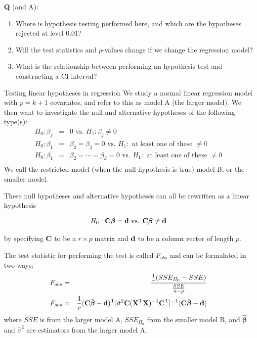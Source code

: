 \documentclass[
  ignorenonframetext,
]{beamer}
\begin{document}
\begin{frame}
\textbf{Q} (and A):

\begin{enumerate}
\item
  Where is hypothesis testing performed here, and which are the
  hypotheses rejected at level \(0.01\)?
\item
  Will the test statistics and \(p\)-values change if we change the
  regression model?
\item
  What is the relationship between performing an hypothesis test and
  constructing a CI interval?
\end{enumerate}
\end{frame}

\begin{frame}
\begin{block}{Testing linear hypotheses in regression}
\label{testing-linear-hypotheses-in-regression}
We study a normal linear regression model with \(p=k+1\) covariates, and
refer to this as model A (the larger model). We then want to investigate
the null and alternative hypotheses of the following type(s):
\begin{eqnarray*}
 H_0: \beta_{j}&=&0 \text{ vs. } H_1:\beta_j\neq 0\\
 H_0: \beta_{1}&=&\beta_{2}=\beta_{3}=0 \text{ vs. } H_1:\text{ at least one of these }\neq 0\\
 H_0: \beta_{1}&=&\beta_{2}=\cdots=\beta_{k}=0 \text{ vs. } H_1:\text{ at least one of these }\neq 0\\
 \end{eqnarray*} We call the restricted model (when the null hypothesis
is true) model B, or the smaller model.
\end{block}
\end{frame}

\begin{frame}
These null hypotheses and alternative hypotheses can all be rewritten as
a linear hypothesis

\[
H_0: {\bf C}{\boldsymbol \beta}={\bf d} \text{ vs. } {\bf C}{\boldsymbol \beta}\neq {\bf d}
\]

by specifying \({\bf C}\) to be a \(r \times p\) matrix and \({\bf d}\)
to be a column vector of length \(p\).

The test statistic for performing the test is called \(F_{obs}\) and can
be formulated in two ways: \begin{eqnarray}
F_{obs}&=&\frac{\frac{1}{r} (SSE_{H_0}-SSE)}{\frac{SSE}{n-p}} \label{Fobsnested}\\
F_{obs}&=&\frac{1}{r}({\bf C}\hat{{\boldsymbol \beta}}-{\bf d})^{\text T}[\hat{\sigma}^2 {\bf C}({\bf X}^{\text T}{\bf X})^{-1}{\bf C}^{\text T}]^{-1}({\bf C}\hat{{\boldsymbol \beta}}-{\bf d}) \label{FobsCbeta}
\end{eqnarray} where \(SSE\) is from the larger model A, \(SSE_{H_0}\)
from the smaller model B, and \(\hat{{\boldsymbol \beta}}\) and
\(\hat{\sigma}^2\) are estimators from the larger model A.
\end{frame}
\end{document}
